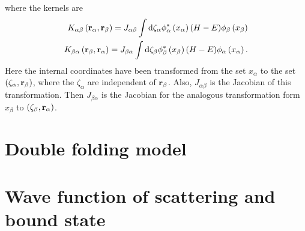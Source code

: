\documentclass[
11pt, %
english, %
onehalfspacing, %
headsepline, %
]{MastersDoctoralThesis} %
\begin{document}
where the kernels are
\begin{align}
K_{\alpha \beta} \left( {\bf r}_\alpha, {\bf r}_\beta \right) = 
J_{\alpha \beta}
\int \text{d} \zeta_\alpha \phi_\alpha^* \left( x_\alpha \right)
(H-E) \phi_\beta \left( x_\beta \right) \nonumber \\
K_{\beta \alpha} \left( {\bf r}_\beta, {\bf r}_\alpha \right) = 
J_{\beta \alpha}
\int \text{d} \zeta_\beta \phi_\beta^* \left( x_\beta \right)
(H-E) \phi_\alpha \left( x_\alpha \right).
\end{align}
Here the internal coordinates have been transformed from the set $x_\alpha$ to the set $\left( \zeta_\alpha, {\bf r}_\beta \right)$, where the $\zeta_\alpha$ are independent of ${\bf r}_\beta$. Also, $J_{\alpha \beta}$ is the Jacobian of this transformation. Then $J_{\beta \alpha}$ is the Jacobian for the analogous transformation form $x_\beta$ to $\left( \zeta_\beta,{\bf r}_\alpha  \right)$.

\section{Double folding model}
\section{Wave function of scattering and bound state}
\end{document}

